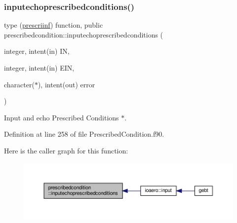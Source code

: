\mbox{\label{namespaceprescribedcondition_a66d378b405e124a0d9a7ad04e262109b}} 
\subsubsection{\texorpdfstring{inputechoprescribedconditions()}{inputechoprescribedconditions()}}
{\footnotesize\ttfamily type (\hyperlink{structprescribedcondition_1_1prescriinf}{prescriinf}) function, public prescribedcondition\+::inputechoprescribedconditions (\begin{DoxyParamCaption}\item[{integer, intent(in)}]{IN,  }\item[{integer, intent(in)}]{E\+IN,  }\item[{character($\ast$), intent(out)}]{error }\end{DoxyParamCaption})}



Input and echo Prescribed Conditions $\ast$. 



Definition at line 258 of file Prescribed\+Condition.\+f90.

Here is the caller graph for this function\+:\nopagebreak
\begin{figure}[H]
\begin{center}
\leavevmode
\includegraphics[width=350pt]{namespaceprescribedcondition_a66d378b405e124a0d9a7ad04e262109b_icgraph}
\end{center}
\end{figure}
\mbox{\label{namespaceprescribedcondition_a55980eb8579eed448879c6118e6218c7}} 
